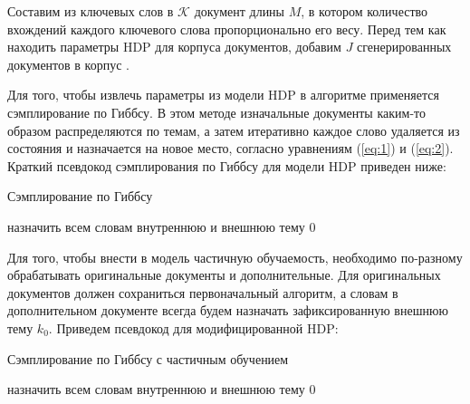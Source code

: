 \documentclass[14pt,a4paper,oneside]{extarticle}
\begin{document}
	Составим из ключевых слов в $\mathcal{K}$ документ длины $M$, в котором количество вхождений каждого ключевого слова пропорционально его весу. Перед тем как находить параметры HDP для корпуса документов, добавим $J$ сгенерированных документов в корпус \cite{ss-learning}. 
	
  Для того, чтобы извлечь параметры из модели HDP в алгоритме применяется сэмплирование по Гиббсу. В этом методе изначальные документы каким-то образом распределяются по темам, а затем итеративно каждое слово удаляется из состояния и назначается на новое место, согласно уравнениям (\ref{eq:1}) и (\ref{eq:2}). Краткий псевдокод сэмплирования по Гиббсу для модели HDP приведен ниже:
  
  \begin{algorithm}[H]
  	\caption{Сэмплирование по Гиббсу}
  	назначить всем словам внутреннюю и внешнюю тему $0$\;
  \end{algorithm}
  
  Для того, чтобы внести в модель частичную обучаемость, необходимо по-разному обрабатывать оригинальные документы и дополнительные. Для оригинальных документов должен сохраниться первоначальный алгоритм, а словам в дополнительном документе всегда будем назначать зафиксированную внешнюю тему $k_0$. Приведем псевдокод для модифицированной HDP:
  
  \begin{algorithm}[H]
  	\caption{Сэмплирование по Гиббсу с частичным обучением}
  	назначить всем словам внутреннюю и внешнюю тему $0$\;
  \end{algorithm}
  
\end{document}
